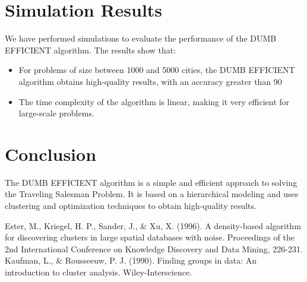 \documentclass{article}
\begin{document}
\section{Simulation Results}
We have performed simulations to evaluate the performance of the DUMB EFFICIENT algorithm. The results show that:
\begin{itemize}
\item For problems of size between 1000 and 5000 cities, the DUMB EFFICIENT algorithm obtains high-quality results, with an accuracy greater than 90%
\item The time complexity of the algorithm is linear, making it very efficient for large-scale problems.
\end{itemize}

\section{Conclusion}
The DUMB EFFICIENT algorithm is a simple and efficient approach to solving the Traveling Salesman Problem. It is based on a hierarchical modeling and uses clustering and optimization techniques to obtain high-quality results.




\begin{thebibliography}{9}
 Ester, M., Kriegel, H. P., Sander, J., & Xu, X. (1996). A density-based algorithm for discovering clusters in large spatial databases with noise. Proceedings of the 2nd International Conference on Knowledge Discovery and Data Mining, 226-231.
 Kaufman, L., & Rousseeuw, P. J. (1990). Finding groups in data: An introduction to cluster analysis. Wiley-Interscience.
\end{thebibliography}
\end{document}
